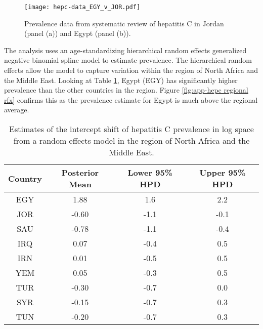     \begin{figure}[h]
        \begin{center}
            \texttt{[image: hepc-data\_EGY\_v\_JOR.pdf]}
            \caption{Prevalence data from systematic review of
              hepatitis C in Jordan (panel (a)) and Egypt (panel
              (b)).}
            \label{fig:app-hepc data}
        \end{center}
    \end{figure}

The analysis uses an age-standardizing hierarchical random effects
generalized negative binomial spline model to estimate prevalence.
The hierarchical random effects allow the model to capture variation
within the region of North Africa and the Middle East.  Looking at
Table \ref{tab:app-hepc regional rfx}, Egypt (EGY) has significantly
higher prevalence than the other countries in the region.  Figure
\ref{fig:app-hepc regional rfx} confirms this as the prevalence
estimate for Egypt is much above the regional average.

    \begin{table}[h]
        \begin{center}
        \caption{ Estimates of the intercept shift of hepatitis C prevalence in log space from a random effects model in the region of North Africa and the Middle East.}
        \label{tab:app-hepc regional rfx}
        \begin{tabular}{|c|c|c|c|}
            \hline
                Country & Posterior Mean & Lower 95\% HPD  & Upper 95\%  HPD \\
            \hline
                EGY	&	1.88	&	 1.6	&	2.2	\\
                JOR	&	-0.60	&	-1.1	&	-0.1 \\
                SAU	&	-0.78	&	-1.1	&	-0.4 \\
                IRQ	&	0.07	&	-0.4	&	0.5	\\
                IRN	&	0.01	&	-0.5	&	0.5	\\
                YEM	&	0.05	&	-0.3	&	0.5	\\
                TUR	&	-0.30	&	-0.7	&	0.0	\\
                SYR	&	-0.15	&	-0.7	&	0.3	\\
                TUN	&	-0.20	&	-0.7	&	0.3	\\
            \hline
        \end{tabular}
        \end{center}
    \end{table}

